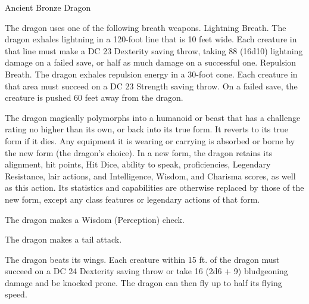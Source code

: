 \begin{monsterbox}{Ancient Bronze Dragon}
\begin{monsteraction}
\end{monsteraction}
\begin{monsteraction}
The dragon uses one of the following breath weapons.
Lightning Breath. The dragon exhales lightning in a 120-foot line that is 10 feet wide. Each creature in that line must make a DC 23 Dexterity saving throw, taking 88 (16d10) lightning damage on a failed save, or half as much damage on a successful one.
Repulsion Breath. The dragon exhales repulsion energy in a 30-foot cone. Each creature in that area must succeed on a DC 23 Strength saving throw. On a failed save, the creature is pushed 60 feet away from the dragon.
\end{monsteraction}
\begin{monsteraction}
The dragon magically polymorphs into a humanoid or beast that has a challenge rating no higher than its own, or back into its true form. It reverts to its true form if it dies. Any equipment it is wearing or carrying is absorbed or borne by the new form (the dragon's choice).
In a new form, the dragon retains its alignment, hit points, Hit Dice, ability to speak, proficiencies, Legendary Resistance, lair actions, and Intelligence, Wisdom, and Charisma scores, as well as this action. Its statistics and capabilities are otherwise replaced by those of the new form, except any class features or legendary actions of that form.
\end{monsteraction}
\begin{monsteraction}[Detect]
The dragon makes a Wisdom (Perception) check.
\end{monsteraction}
\begin{monsteraction}
The dragon makes a tail attack.
\end{monsteraction}
\begin{monsteraction}
The dragon beats its wings. Each creature within 15 ft. of the dragon must succeed on a DC 24 Dexterity saving throw or take 16 (2d6 + 9) bludgeoning damage and be knocked prone. The dragon can then fly up to half its flying speed.
\end{monsteraction}
\end{monsterbox}